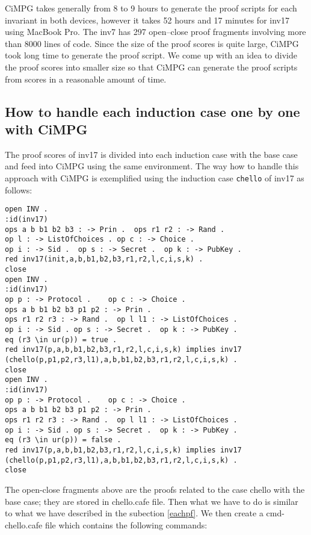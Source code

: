 \documentclass[a4paper,fleqn]{cas-dc}
\begin{document}
CiMPG takes generally from 8 to 9 hours to generate the proof scripts for each invariant in both devices, however it takes 52 hours and 17 minutes for 
inv17 using MacBook Pro. The inv7 has 297 open–close proof fragments involving more than 8000 lines of code. Since the size of the proof scores is quite large, CiMPG took long time to generate the proof script. We come up with an idea to divide the proof scores into smaller size
so that CiMPG can generate the proof scripts from scores in a reasonable amount of time. 

\subsection{How to handle each induction case one by one with CiMPG} \label{eachinduction}
The proof scores of inv17 is divided into each induction case with the base case and feed into CiMPG using the same environment. The way how to handle this approach with CiMPG is exemplified using the induction case \verb!chello! of inv17 as follows: 
\begin{verbatim}
open INV .
:id(inv17)
ops a b b1 b2 b3 : -> Prin .  ops r1 r2 : -> Rand .
op l : -> ListOfChoices . op c : -> Choice .
op i : -> Sid .  op s : -> Secret .  op k : -> PubKey .
red inv17(init,a,b,b1,b2,b3,r1,r2,l,c,i,s,k) .
close
open INV .
:id(inv17)
op p : -> Protocol .    op c : -> Choice .  
ops a b b1 b2 b3 p1 p2 : -> Prin .   
ops r1 r2 r3 : -> Rand .  op l l1 : -> ListOfChoices .   
op i : -> Sid . op s : -> Secret .  op k : -> PubKey .
eq (r3 \in ur(p)) = true .
red inv17(p,a,b,b1,b2,b3,r1,r2,l,c,i,s,k) implies inv17
(chello(p,p1,p2,r3,l1),a,b,b1,b2,b3,r1,r2,l,c,i,s,k) .
close
open INV .
:id(inv17)
op p : -> Protocol .    op c : -> Choice .  
ops a b b1 b2 b3 p1 p2 : -> Prin .   
ops r1 r2 r3 : -> Rand .  op l l1 : -> ListOfChoices .   
op i : -> Sid . op s : -> Secret .  op k : -> PubKey .
eq (r3 \in ur(p)) = false .
red inv17(p,a,b,b1,b2,b3,r1,r2,l,c,i,s,k) implies inv17
(chello(p,p1,p2,r3,l1),a,b,b1,b2,b3,r1,r2,l,c,i,s,k) .
close
\end{verbatim}
The open-close fragments above are the proofs related to the case chello with the base case; they are stored in chello.cafe file. Then what we have to do is similar to what we have described in the subection \ref{eachpf}. We then create a cmd-chello.cafe file which contains the following commands:
\end{document}
